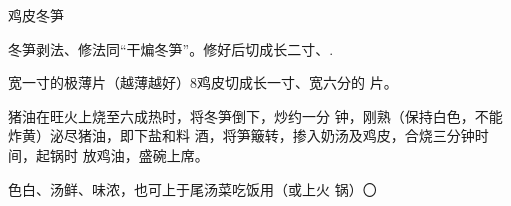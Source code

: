 \begin{recipe}{鸡皮冬笋}

\ingredients


\cooking

\step 冬笋剥法、修法同“干煸冬笋”。修好后切成长二寸、.

宽一寸的极薄片（越薄越好）8鸡皮切成长一寸、宽六分的 片。

\step 猪油在旺火上烧至六成热时，将冬笋倒下，炒约一分 钟，刚熟（保持白色，不能炸黄）泌尽猪油，即下盐和料 酒，将笋簸转，掺入奶汤及鸡皮，合烧三分钟时间，起锅时 放鸡油，盛碗上席。

\notes

色白、汤鲜、味浓，也可上于尾汤菜吃饭用（或上火 锅）〇

\end{recipe}

